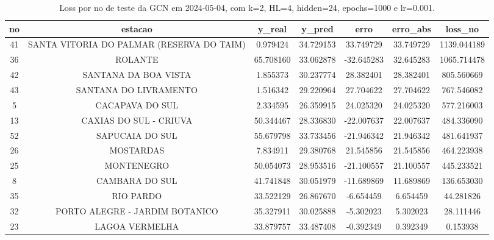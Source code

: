 \begin{table}[h]
\centering
\caption{Loss por no de teste da GCN em 2024-05-04, com k=2, HL=4, hidden=24, epochs=1000 e lr=0.001.}
\label{tab:gcn_loss_k2_hl4_h24_e1000_d20240504}
\begin{tabular}{ccccccc}
\toprule
no & estacao & y\_real & y\_pred & erro & erro\_abs & loss\_no \\
\midrule
41 & SANTA VITORIA DO PALMAR (RESERVA DO TAIM) & 0.979424 & 34.729153 & 33.749729 & 33.749729 & 1139.044189 \\
36 & ROLANTE & 65.708160 & 33.062878 & -32.645283 & 32.645283 & 1065.714478 \\
42 & SANTANA DA BOA VISTA & 1.855373 & 30.237774 & 28.382401 & 28.382401 & 805.560669 \\
43 & SANTANA DO LIVRAMENTO & 1.516342 & 29.220964 & 27.704622 & 27.704622 & 767.546082 \\
5 & CACAPAVA DO SUL & 2.334595 & 26.359915 & 24.025320 & 24.025320 & 577.216003 \\
13 & CAXIAS DO SUL - CRIUVA & 50.344467 & 28.336830 & -22.007637 & 22.007637 & 484.336090 \\
52 & SAPUCAIA DO SUL & 55.679798 & 33.733456 & -21.946342 & 21.946342 & 481.641937 \\
26 & MOSTARDAS & 7.834911 & 29.380768 & 21.545856 & 21.545856 & 464.223938 \\
25 & MONTENEGRO & 50.054073 & 28.953516 & -21.100557 & 21.100557 & 445.233521 \\
8 & CAMBARA DO SUL & 41.741848 & 30.051979 & -11.689869 & 11.689869 & 136.653030 \\
35 & RIO PARDO & 33.522129 & 26.867670 & -6.654459 & 6.654459 & 44.281826 \\
32 & PORTO ALEGRE - JARDIM BOTANICO & 35.327911 & 30.025888 & -5.302023 & 5.302023 & 28.111446 \\
23 & LAGOA VERMELHA & 33.879757 & 33.487408 & -0.392349 & 0.392349 & 0.153938 \\
\bottomrule
\end{tabular}
\end{table}
